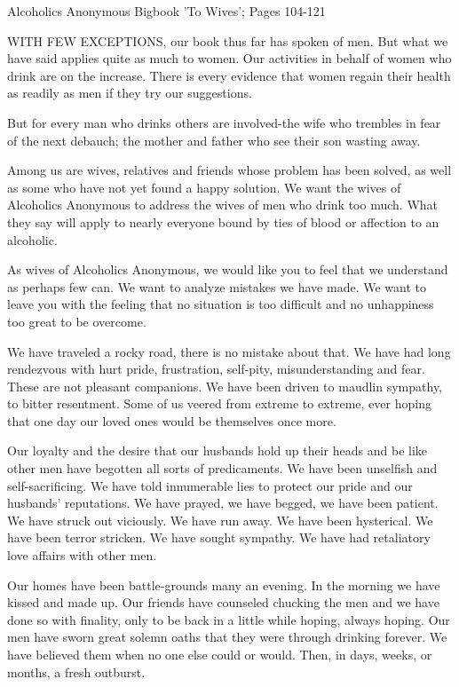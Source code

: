 
Alcoholics Anonymous Bigbook 'To Wives'; Pages 104-121

\begin{biblechapter}
WITH FEW EXCEPTIONS, our book thus far has spoken of men.  But what we have said applies quite as much to women.  Our activities in behalf of women who drink are on the increase.  There is every evidence that women regain their health as readily as men if they try our suggestions.

But for every man who drinks others are involved-the wife who trembles in fear of the next debauch; the mother and father who see their son wasting away.

Among us are wives, relatives and friends whose problem has been solved, as well as some who have not yet found a happy solution.  We want the wives of Alcoholics Anonymous to address the wives of men who drink too much.  What they say will apply to nearly everyone bound by ties of blood or affection to an alcoholic.

As wives of Alcoholics Anonymous, we would like you to feel that we understand as perhaps few can.  We want to analyze mistakes we have made.  We want to leave you with the feeling that no situation is too difficult and no unhappiness too great to be overcome.

We have traveled a rocky road, there is no mistake about that.  We have had long rendezvous with hurt pride, frustration, self-pity, misunderstanding and fear.  These are not pleasant companions.  We have been driven to maudlin sympathy, to bitter resentment.  Some of us veered from extreme to extreme, ever hoping that one day our loved ones would be themselves once more.

Our loyalty and the desire that our husbands hold up their heads and be like other men have begotten all sorts of predicaments.  We have been unselfish and self-sacrificing.  We have told innumerable lies to protect our pride and our husbands' reputations.  We have prayed, we have begged, we have been patient.  We have struck out viciously.  We have run away.  We have been hysterical.  We have been terror stricken.  We have sought sympathy.  We have had retaliatory love affairs with other men.

Our homes have been battle-grounds many an evening.  In the morning we have kissed and made up.  Our friends have counseled chucking the men and we have done so with finality, only to be back in a little while hoping, always hoping.  Our men have sworn great solemn oaths that they were through drinking forever.  We have believed them when no one else could or would.  Then, in days, weeks, or months, a fresh outburst.


\end{biblechapter}
